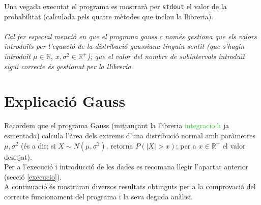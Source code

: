 \documentclass[12pt]{article}
\begin{document}
Una vegada executat el programa es mostrarà per \texttt{stdout} el valor de la probabilitat (calculada pels quatre mètodes que inclou la llibreria).\\\\
\textit{Cal fer especial menció en que el programa gauss.c només gestiona que els valors introduïts per l'equació de la distribució gaussiana tinguin sentit (que s'hagin introduït $\mu\in\mathbb{R}$, $x, \sigma^2\in\mathbb{R^+}$); que el valor del nombre de subintervals introduït sigui correcte és gestionat per la llibreria}.
\newpage

\section{Explicació Gauss}
Recordem que el programa Gauss (mitjançant la llibreria \textcolor{LimeGreen}{integracio.h} ja esmentada) calcula l'àrea dels extrems d'una distribució normal amb paràmetres $\mu, \sigma^2$ (és a dir; si $X \sim N(\mu,\sigma^2)$, retorna $P(|X|> x)$; per a $x\in \mathbb{R^+}$ el valor desitjat).\\
Per a l'execució i introducció de les dades es recomana llegir l'apartat anterior (secció \textcolor{blue}{\ref{execucio}}).\\
 A continuació és mostraran diversos resultats obtinguts per a la comprovació del correcte funcionament del programa i la seva deguda anàlisi.
\end{document}
